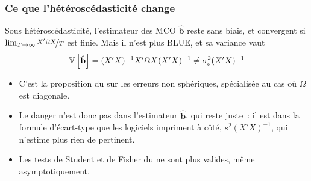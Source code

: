 \documentclass[10pt]{beamer}
\begin{document}
\begin{frame}
  \frametitle{Ce que l'hétéroscédasticité change}

  \begin{prop}\label{prop:mco:heteroscedasticite}
    Sous hétéroscédasticité, l'estimateur des MCO $\hat{\mathbf b}$ reste sans
    biais, et convergent si $\lim_{T\rightarrow\infty}\nicefrac{X'\Omega X}{T}$
    est finie. Mais il n'est plus BLUE, et sa variance vaut
    \[
      \mathbb V\left[\hat{\mathbf b}\right] = (X'X)^{-1}X'\Omega X(X'X)^{-1}
      \neq \sigma_{\varepsilon}^2 (X'X)^{-1}
    \]
  \end{prop}

  \bigskip

  \begin{itemize}

  \item C'est la proposition du  sur les erreurs non sphériques,
    spécialisée au cas où $\Omega$ est diagonale.\newline

  \item[\dbend] Le danger n'est donc pas dans l'estimateur $\hat{\mathbf b}$,
    qui reste juste~: il est dans la formule d'écart-type que les logiciels
    impriment à côté, $s^2(X'X)^{-1}$, qui n'estime plus rien de pertinent.\newline

  \item[$\Rightarrow$] Les tests de Student et de Fisher du  ne
    sont plus valides, même asymptotiquement.

  \end{itemize}

\end{frame}
\end{document}
